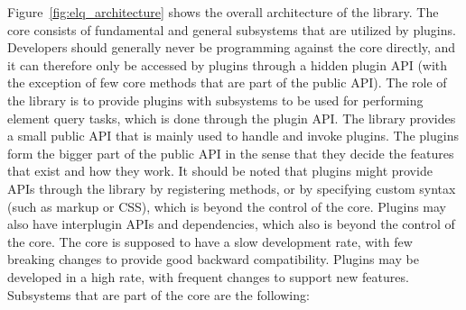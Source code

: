 \documentclass[a4paper,11pt]{kth-mag}
\begin{document}
      Figure~\ref{fig:elq_architecture} shows the overall architecture of the library.
      The core consists of fundamental and general subsystems that are utilized by plugins.
      Developers should generally never be programming against the core directly, and it can therefore only be accessed by plugins through a hidden plugin \gls{API} (with the exception of few core methods that are part of the public \gls{API}).
      The role of the library is to provide plugins with subsystems to be used for performing element query tasks, which is done through the plugin \gls{API}.
      The library provides a small public \gls{API} that is mainly used to handle and invoke plugins.
      The plugins form the bigger part of the public \gls{API} in the sense that they decide the features that exist and how they work.
      It should be noted that plugins might provide \glspl{API} through the library by registering methods, or by specifying custom syntax (such as markup or \gls{CSS}), which is beyond the control of the core.
      Plugins may also have interplugin \glspl{API} and dependencies, which also is beyond the control of the core.
      The core is supposed to have a slow development rate, with few breaking changes to provide good backward compatibility.
      Plugins may be developed in a high rate, with frequent changes to support new features.
      Subsystems that are part of the core are the following:
\end{document}
